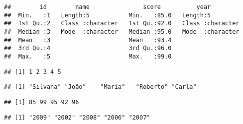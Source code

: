 \documentclass[
]{article}
\newenvironment{Shaded}{\begin{snugshade}}{\end{snugshade}}
\newcommand{\FunctionTok}[1]{\textcolor[rgb]{0.00,0.00,0.00}{#1}}
\newcommand{\NormalTok}[1]{#1}
\newcommand{\SpecialCharTok}[1]{\textcolor[rgb]{0.00,0.00,0.00}{#1}}
\begin{document}
\begin{verbatim}
##        id        name               score          year          
##  Min.   :1   Length:5           Min.   :85.0   Length:5          
##  1st Qu.:2   Class :character   1st Qu.:92.0   Class :character  
##  Median :3   Mode  :character   Median :95.0   Mode  :character  
##  Mean   :3                      Mean   :93.4                     
##  3rd Qu.:4                      3rd Qu.:96.0                     
##  Max.   :5                      Max.   :99.0
\end{verbatim}

\begin{Shaded}
\end{Shaded}

\begin{verbatim}
## [1] 1 2 3 4 5
\end{verbatim}

\begin{Shaded}
\end{Shaded}

\begin{verbatim}
## [1] "Silvana" "João"    "Maria"   "Roberto" "Carla"
\end{verbatim}

\begin{Shaded}
\end{Shaded}

\begin{verbatim}
## [1] 85 99 95 92 96
\end{verbatim}

\begin{Shaded}
\end{Shaded}

\begin{verbatim}
## [1] "2009" "2002" "2008" "2006" "2007"
\end{verbatim}
\end{document}
